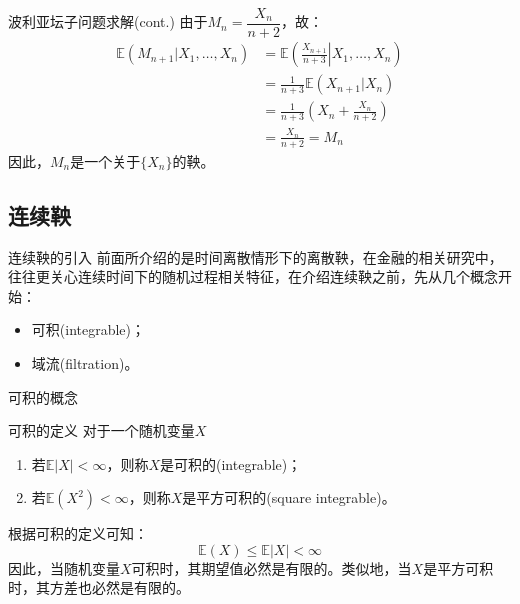 \documentclass[t]{beamer}
\newcommand{\E}{\mathbb{E}}
\begin{document}
\begin{frame}{波利亚坛子问题求解(cont.)}
由于$M_n=\dfrac{X_n}{n+2}$，故：
\[\begin{split}
\E(M_{n+1}|X_1,\ldots,X_n)&= \E\left.\left(\frac{X_{n+1}}{n+3}\right|X_1,\ldots,X_n \right)\\
&=\frac{1}{n+3}\E(X_{n+1}|X_n)\\
&=\frac{1}{n+3}\left(X_n+\frac{X_n}{n+2}\right)\\
&=\frac{X_n}{n+2}=M_n
\end{split}\]
因此，$M_n$是一个关于$\{X_n\}$的鞅。
\end{frame}


      
      
      
      \subsection{连续鞅}
      
      \begin{frame}{连续鞅的引入}
      前面所介绍的是时间离散情形下的离散鞅，在金融的相关研究中，往往更关心连续时间下的随机过程相关特征，在介绍连续鞅之前，先从几个概念开始：
      \begin{itemize}
      \item 可积(integrable)；
      \item 域流(filtration)。
      \end{itemize}
      \end{frame}
      
      
      \begin{frame}{可积的概念}
      \begin{block}{可积的定义}
      对于一个随机变量$X$
      \begin{enumerate}
      \item 若$\E|X|<\infty$，则称$X$是可积的(integrable)；
      \item  若$\E(X^2)<\infty$，则称$X$是平方可积的(square integrable)。
      \end{enumerate}
      \end{block}
      
      根据可积的定义可知：
      \begin{equation*}
      \E(X)\le \E|X|<\infty
      \end{equation*}
      因此，当随机变量$X$可积时，其期望值必然是有限的。类似地，当$X$是平方可积时，其方差也必然是有限的。
      \end{frame}
      
\end{document}
